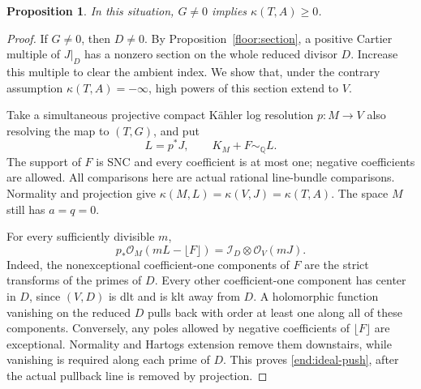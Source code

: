 \documentclass[11pt,letterpaper]{article}
\newtheorem{proposition}[theorem]{Proposition}
\theoremstyle{definition}
\theoremstyle{remark}
\begin{document}
\begin{proposition}\label{end:boundary-nonvanishing}
In this situation, \(G\ne0\) implies \(\kappa(T,A)\ge0\).
\end{proposition}

\begin{proof}
If \(G\ne0\), then \(D\ne0\). By
Proposition~\ref{floor:section}, a positive Cartier multiple of
\(J|_D\) has a nonzero section on the whole reduced divisor
\(D\). Increase this multiple to clear the ambient index. We show
that, under the contrary assumption \(\kappa(T,A)=-\infty\),
high powers of this section extend to \(V\).

Take a simultaneous projective compact K\"ahler log resolution
\(p:M\to V\) also resolving the map to \((T,G)\), and put
\begin{equation}\label{end:crepant}
 L=p^*J,\qquad K_M+F\sim_{\mathbb{Q}}L.
\end{equation}
The support of \(F\) is SNC and every coefficient is at most one;
negative coefficients are allowed. All comparisons here are actual
rational line-bundle comparisons. Normality and projection give
\(\kappa(M,L)=\kappa(V,J)=\kappa(T,A)\). The space \(M\)
still has \(a=q=0\).

For every sufficiently divisible \(m\),
\begin{equation}\label{end:ideal-push}
 p_*\mathcal{O}_M(mL-\lfloor F\rfloor)
   =\mathcal I_D\otimes\mathcal{O}_V(mJ).
\end{equation}
Indeed, the nonexceptional coefficient-one components of \(F\)
are the strict transforms of the primes of \(D\). Every other
coefficient-one component has center in \(D\), since \((V,D)\)
is dlt and is klt away from \(D\). A holomorphic function vanishing
on the reduced \(D\) pulls back with order at least one along all
of these components. Conversely, any poles allowed by negative
coefficients of \(\lfloor F\rfloor\) are exceptional. Normality
and Hartogs extension remove them downstairs, while vanishing is
required along each prime of \(D\). This proves
\eqref{end:ideal-push}, after the actual pullback line is removed
by projection.


\end{proof}
\end{document}
